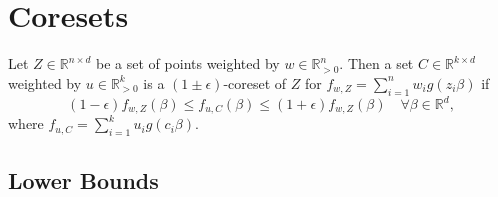 \section{Coresets}

\begin{definition}
    Let $Z \in \mathbb{R}^{n \times d}$ be a set of points weighted by
    $w \in \mathbb{R}^n_{>0}$.
    Then a set $C \in \mathbb{R}^{k \times d}$ weighted
    by $u \in \mathbb{R}^k_{>0}$ is a $(1 \pm \epsilon)$-coreset
    of $Z$ for $f_{w, Z} = \sum_{i=1}^n w_i g(z_i \beta)$ if
    \begin{equation*}
        \ (1 - \epsilon)f_{w, Z}(\beta)
        \leq f_{u, C}(\beta) \leq (1 + \epsilon)f_{w, Z}(\beta)
        \quad \forall \beta \in \mathbb{R}^d,
    \end{equation*}
    where $f_{u, C} = \sum_{i=1}^k u_i g(c_i \beta)$.
\end{definition}

\subsection{Lower Bounds}

